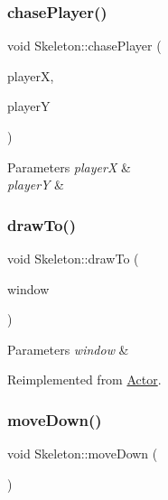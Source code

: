 \subsubsection{\texorpdfstring{chasePlayer()}{chasePlayer()}}
{\footnotesize\ttfamily void Skeleton\+::chase\+Player (\begin{DoxyParamCaption}\item[{float}]{playerX,  }\item[{float}]{playerY }\end{DoxyParamCaption})}


\begin{DoxyParams}{Parameters}
{\em playerX} & \\
\hline
{\em playerY} & \\
\hline
\end{DoxyParams}
\mbox{\label{classSkeleton_aa39ac09590a5274536dc2fc125cc62e6}} 
\subsubsection{\texorpdfstring{drawTo()}{drawTo()}}
{\footnotesize\ttfamily void Skeleton\+::draw\+To (\begin{DoxyParamCaption}\item[{sf\+::\+Render\+Window \&}]{window }\end{DoxyParamCaption})\hspace{0.3cm}{\ttfamily [virtual]}}


\begin{DoxyParams}{Parameters}
{\em window} & \\
\hline
\end{DoxyParams}


Reimplemented from \mbox{\hyperlink{classActor_af73a6f6670f0507c9e55ec2f61293535}{Actor}}.

\mbox{\label{classSkeleton_aee2055fa3d1db80392b365aa40c878bf}} 
\subsubsection{\texorpdfstring{moveDown()}{moveDown()}}
{\footnotesize\ttfamily void Skeleton\+::move\+Down (\begin{DoxyParamCaption}{ }\end{DoxyParamCaption})\hspace{0.3cm}{\ttfamily [virtual]}}



